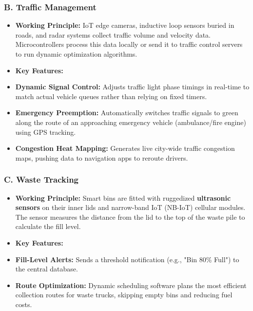 \subsubsection{B. Traffic Management}
\begin{itemize}
  \item   \textbf{Working Principle:} IoT edge cameras, inductive loop sensors buried in roads, and radar systems collect traffic volume and velocity data. Microcontrollers process this data locally or send it to traffic control servers to run dynamic optimization algorithms.
  \item   \textbf{Key Features:}
  \item   \textbf{Dynamic Signal Control:} Adjusts traffic light phase timings in real-time to match actual vehicle queues rather than relying on fixed timers.
  \item   \textbf{Emergency Preemption:} Automatically switches traffic signals to green along the route of an approaching emergency vehicle (ambulance/fire engine) using GPS tracking.
  \item   \textbf{Congestion Heat Mapping:} Generates live city-wide traffic congestion maps, pushing data to navigation apps to reroute drivers.
\end{itemize}

\subsubsection{C. Waste Tracking}
\begin{itemize}
  \item   \textbf{Working Principle:} Smart bins are fitted with ruggedized \textbf{ultrasonic sensors} on their inner lids and narrow-band IoT (NB-IoT) cellular modules. The sensor measures the distance from the lid to the top of the waste pile to calculate the fill level.
  \item   \textbf{Key Features:}
  \item   \textbf{Fill-Level Alerts:} Sends a threshold notification (e.g., "Bin 80\% Full") to the central database.
  \item   \textbf{Route Optimization:} Dynamic scheduling software plans the most efficient collection routes for waste trucks, skipping empty bins and reducing fuel costs.
\end{itemize}

